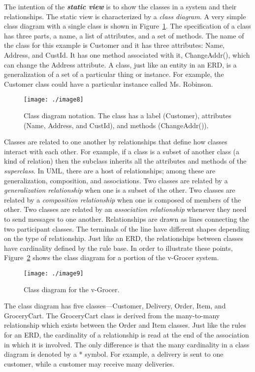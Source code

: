 The intention of the \emph{\textbf{static view}} is to show the classes
in a system and their relationships. The static view is characterized by
a \emph{class diagram}. A very simple class diagram with a single class
is shown in Figure~\ref{figure:classDiagram}. 
The specification of a class has three parts, a
name, a list of attributes, and a set of methods. The name of the class
for this example is Customer and it has three attributes: Name, Address,
and CustId. It has one method associated with it, ChangeAddr(), which
can change the Address attribute. A class, just like an entity in an
ERD, is a generalization of a set of a particular thing or instance. For
example, the Customer class could have a particular instance called Ms.
Robinson.

\begin{figure}
\texttt{[image: ./image8]}
\caption{Class diagram notation. The class has a label
(Customer), attributes (Name, Address, and CustId), and methods
(ChangeAddr()).}
\label{figure:classDiagram}
\end{figure}

Classes are related to one another by relationships that define how
classes interact with each other. For example, if a class is a subset of
another class (a kind of relation) then the subclass inherits all the
attributes and methods of the \emph{superclass}. In UML, there are a
host of relationships; among these are generalization, composition, and
associations. Two classes are related by a \emph{generalization
relationship} when one is a subset of the other. Two classes are related
by a \emph{composition relationship} when one is composed of members of
the other. Two classes are related by an \emph{association relationship}
whenever they need to send messages to one another. Relationships are
drawn as lines connecting the two participant classes. The terminals of
the line have different shapes depending on the type of relationship.
Just like an ERD, the relationships between classes have cardinality
defined by the rule base. In order to illustrate these points, 
Figure~\ref{figure:classVgrocer} 
shows the class diagram for a portion of the v-Grocer system.

\begin{figure}
\texttt{[image: ./image9]}
\caption{Class diagram for the v-Grocer.}
\label{figure:classVgrocer}
\end{figure}

The class diagram has five classes---Customer, Delivery, Order, Item,
and GroceryCart. The GroceryCart class is derived from the many-to-many
relationship which exists between the Order and Item classes. Just like
the rules for an ERD, the cardinality of a relationship is read at the
end of the association in which it is involved. The only difference is
that the many cardinality in a class diagram is denoted by a * symbol.
For example, a delivery is sent to one customer, while a customer may
receive many deliveries.


